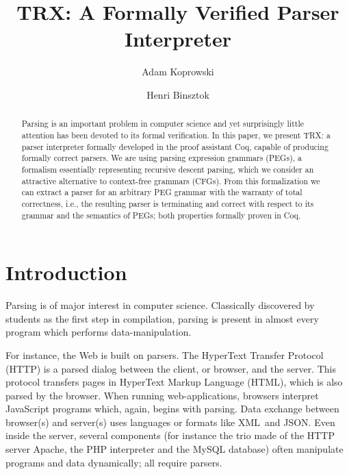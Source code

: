 \documentclass{LMCS}
\newcommand{\coq}{Coq}
\newcommand{\xml}{XML}
\newcommand{\json}{JSON}
\theoremstyle{definition}
\begin{document}
\title{TRX: A Formally Verified Parser Interpreter\rsuper*}

\author[A.~Koprowski]{Adam Koprowski}
\address{MLstate, Paris, France}

\author[H.~Binsztok]{Henri Binsztok}
\address{ pt}





\begin{abstract}
Parsing is an important problem in computer science and yet
surprisingly little attention has been devoted to its formal verification.
In this paper, we present TRX: a parser interpreter formally developed
in the proof assistant \coq, capable of producing formally correct parsers. 
We are using parsing expression grammars (PEGs), a formalism essentially 
representing recursive descent parsing, which we consider an attractive 
alternative to context-free grammars (CFGs). From this formalization we 
can extract a parser for an arbitrary PEG grammar with the warranty of 
total correctness, i.e., the resulting parser is terminating and correct 
with respect to its grammar and the semantics of PEGs; both properties 
formally proven in \coq.
\end{abstract}

\maketitle

\section{Introduction}\label{sec:intro}

Parsing is of major interest in computer science.
Classically discovered by students as the first step in compilation, parsing is present in almost every program which performs data-manipulation. 

For instance, the Web is built on parsers. The HyperText Transfer Protocol (HTTP) is a parsed dialog between the client, or browser, and the server. This protocol transfers pages in HyperText Markup Language (HTML), which is also parsed by the browser.  When running web-applications, browsers interpret JavaScript programs which, again, begins with parsing.  Data exchange between browser(s) and server(s) uses languages or formats like \xml\ and \json. Even inside the server, several components (for instance the trio made of the HTTP server Apache, the PHP interpreter and the MySQL database) often manipulate programs and data dynamically; all require parsers.
\end{document}
